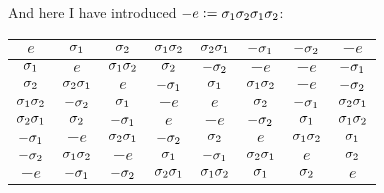 \documentclass[11pt, english, fleqn, DIV=15, headinclude, BCOR=1cm]{scrartcl}
\begin{document}
    And here I have introduced $-e := \1\2\1\2$:

    \begin{tabular}{c|ccccccc}
        $e$ & $\1$ & $\2$ & $\1\2$ & $\2\1$ & $-\1$ & $-\2$ & $-e$ \\
        \midrule
        $\1$ & $e$ & $\1\2$ & $\2$ & $-\2$ & $-e$ & $-e$ & $-\1$ \\
        $\2$ & $\2\1$ & $e$ & $-\1$ & $\1$ & $\1\2$ & $-e$ & $-\2$ \\
        $\1\2$ & $-\2$ & $\1$ & $-e$ & $e$ & $\2$ & $-\1$ & $\2\1$ \\
        $\2\1$ & $\2$ & $-\1$ & $e$ & $-e$ & $-\2$ & $\1$ & $\1\2$ \\
        $-\1$ & $-e$ & $\2\1$ & $-\2$ & $\2$ & $e$ & $\1\2$ & $\1$ \\
        $-\2$ & $\1\2$ & $-e$ & $\1$ & $-\1$ & $\2\1$ & $e$ & $\2$ \\
        $-e$ & $-\1$ & $-\2$ & $\2\1$ & $\1\2$ & $\1$ & $\2$ & $e$ \\
    \end{tabular}
\end{document}
